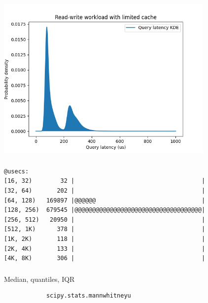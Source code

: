 \documentclass[usenames,dvipsnames, 18pt, compress, aspectratio=169]{beamer}
\begin{document}
\begin{frame}
    \frametitle{}
    \begin{center}
        \includegraphics[width=0.8\textwidth,center]{bimodal-dist.png}
    \end{center}
\end{frame}

\begin{frame}[fragile]{}
    \frametitle{}
    \begin{center}
        \begin{verbatim}
@usecs:
[16, 32)        32 |                                    |
[32, 64)       202 |                                    |
[64, 128)   169897 |@@@@@@                              |
[128, 256)  679545 |@@@@@@@@@@@@@@@@@@@@@@@@@@@@@@@@@@@@|
[256, 512)   20950 |                                    |
[512, 1K)      378 |                                    |
[1K, 2K)       118 |                                    |
[2K, 4K)       133 |                                    |
[4K, 8K)       306 |                                    |
        \end{verbatim}

    \end{center}
\end{frame}

\begin{frame}[fragile]{}
    \frametitle{}
    \begin{center}

    Median, quantiles, IQR

    \begin{verbatim}
            scipy.stats.mannwhitneyu
    \end{verbatim}
    \end{center}
\end{frame}
\end{document}
